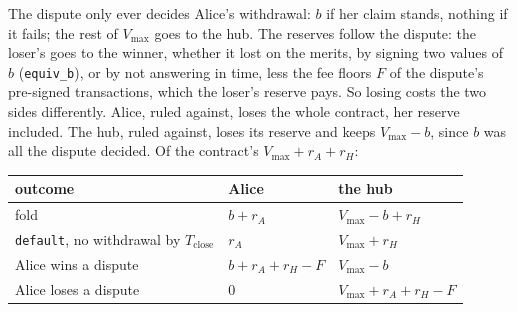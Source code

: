 \documentclass[11pt]{article}
\newcommand{\vmax}{V_{\max}}
\newcommand{\Tc}{T_{\mathrm{close}}}
\newcommand{\tx}[1]{\texttt{#1}}
\begin{document}
The dispute only ever decides Alice's withdrawal: $b$ if her claim
stands, nothing if it fails; the rest of $\vmax$ goes to the hub. The
reserves follow the dispute: the loser's goes to the winner, whether
it lost on the merits, by signing two values of $b$ (\tx{equiv\_b}), or
by not answering in time, less the fee floors $F$ of the dispute's
pre-signed transactions, which the loser's reserve pays. So losing costs
the two sides differently. Alice, ruled against, loses the whole
contract, her reserve included. The hub, ruled against, loses its
reserve and keeps $\vmax - b$, since $b$ was all the dispute decided. Of
the contract's $\vmax + r_A + r_H$:
\begin{center}
\small
\begin{tabular}{lll}
\toprule
outcome & Alice & the hub \\
\midrule
fold & $b + r_A$ & $\vmax - b + r_H$ \\
\tx{default}, no withdrawal by $\Tc$ & $r_A$ & $\vmax + r_H$ \\
Alice wins a dispute & $b + r_A + r_H - F$ & $\vmax - b$ \\
Alice loses a dispute & $0$ & $\vmax + r_A + r_H - F$ \\
\bottomrule
\end{tabular}
\end{center}
\end{document}
